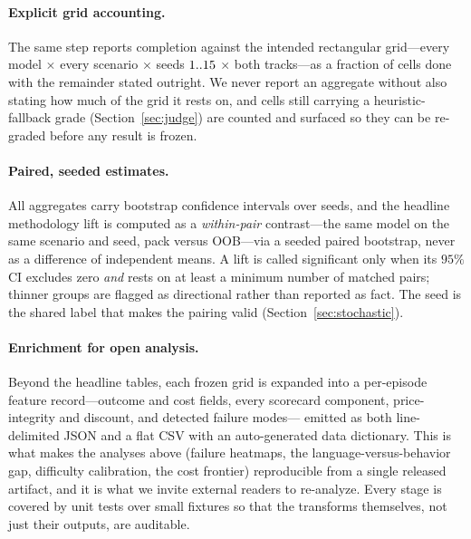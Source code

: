 \paragraph{Explicit grid accounting.} The same step reports completion against the
intended rectangular grid---every model $\times$ every scenario $\times$ seeds
$1..15{}$ $\times$ both tracks---as a fraction of cells done with the
remainder stated outright. We never report an aggregate without also stating how
much of the grid it rests on, and cells still carrying a heuristic-fallback grade
(Section~\ref{sec:judge}) are counted and surfaced so they can be re-graded before
any result is frozen.

\paragraph{Paired, seeded estimates.} All aggregates carry bootstrap confidence
intervals over seeds, and the headline methodology lift is computed as a
\emph{within-pair} contrast---the same model on the same scenario and seed, pack
versus OOB---via a seeded paired bootstrap, never as a difference of independent
means. A lift is called significant only when its $95\%$ CI excludes zero
\emph{and} rests on at least a minimum number of matched pairs; thinner groups are
flagged as directional rather than reported as fact. The seed is the shared label
that makes the pairing valid (Section~\ref{sec:stochastic}).

\paragraph{Enrichment for open analysis.} Beyond the headline tables, each frozen
grid is expanded into a per-episode feature record---outcome and cost fields, every
scorecard component, price-integrity and discount, and detected failure modes---
emitted as both line-delimited JSON and a flat CSV with an auto-generated data
dictionary. This is what makes the analyses above (failure heatmaps, the
language-versus-behavior gap, difficulty calibration, the cost frontier)
reproducible from a single released artifact, and it is what we invite external
readers to re-analyze. Every stage is covered by unit tests over small fixtures so
that the transforms themselves, not just their outputs, are auditable.

